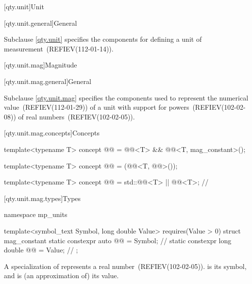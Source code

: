 [qty.unit]{Unit}

[qty.unit.general]{General}

\pnum
Subclause \ref{qty.unit} specifies the components
for defining a unit of measurement~(REFIEV(112-01-14)).

[qty.unit.mag]{Magnitude}

[qty.unit.mag.general]{General}

\pnum
Subclause \ref{qty.unit.mag} specifies the components
used to represent the numerical value~(REFIEV(112-01-29)) of a unit
with support for powers~(REFIEV(102-02-08)) of real numbers~(REFIEV(102-02-05)).

[qty.unit.mag.concepts]{Concepts}

\begin{itemdecl}
template<typename T>
concept @@ = @@<T> && @@<T, mag_constant>();

template<typename T>
concept @@ = (@@<T, @@>());

template<typename T>
concept @@ = std::@@<T> || @@<T>;  // \expos
\end{itemdecl}

[qty.unit.mag.types]{Types}

\begin{codeblock}
namespace mp_units {

template<symbol_text Symbol, long double Value>
  requires(Value > 0)
struct mag_constant {
  static constexpr auto @@ = Symbol;       // \expos
  static constexpr long double @@ = Value;  // \expos
};

}
\end{codeblock}

A specialization of  represents a real number~(REFIEV(102-02-05)).
 is its symbol, and
 is (an approximation of) its value.


